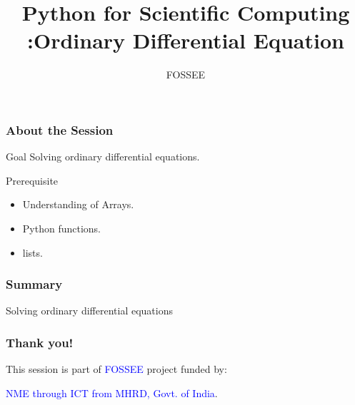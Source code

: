 \documentclass[14pt,compress]{beamer}
\title{Python for Scientific Computing :Ordinary Differential Equation}
\author[FOSSEE] {FOSSEE}
\institute[IIT Bombay] {Department of Aerospace Engineering\\IIT Bombay}
\date{}
\begin{document}
\begin{frame}
  \maketitle
\end{frame}

\begin{frame}
  \frametitle{About the Session}
  \begin{block}{Goal}
Solving ordinary differential equations.
  \end{block}
  \begin{block}{Prerequisite}
    \begin{itemize}
    \item Understanding of Arrays.
    \item Python functions.
    \item lists.
    \end{itemize}    
  \end{block}
\end{frame}

\begin{frame}[fragile]
  \frametitle{Summary}
  \begin{block}{}
    \item Solving ordinary differential equations
  \end{block}    
\end{frame}

\begin{frame}
  \frametitle{Thank you!}  
  \begin{block}{}
  This session is part of \textcolor{blue}{FOSSEE} project funded by:
  \begin{center}
    \textcolor{blue}{NME through ICT from MHRD, Govt. of India}.
  \end{center}  
  \end{block}
\end{frame}
\end{document}
